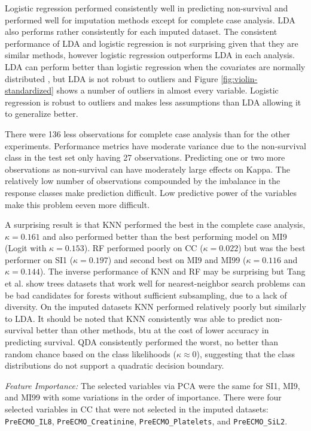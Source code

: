 \documentclass[12pt,]{article}
\begin{document}
Logistic regression performed consistently well in predicting
non-survival and performed well for imputation methods except for
complete case analysis. LDA also performs rather consistently for each
imputed dataset. The consistent performance of LDA and logistic
regression is not surprising given that they are similar methods,
however logistic regression outperforms LDA in each analysis. LDA can
perform better than logistic regression when the covariates are normally
distributed \autocite{efron_efficiency_1975}, but LDA is not robust to
outliers \autocite{hastie_elements_2009} and Figure
\ref{fig:violin-standardized} shows a number of outliers in almost every
variable. Logistic regression is robust to outliers and makes less
assumptions than LDA \autocite{hastie_elements_2009} allowing it to
generalize better.

There were 136 less observations for complete case analysis than for the
other experiments. Performance metrics have moderate variance due to the
non-survival class in the test set only having 27 observations.
Predicting one or two more observations as non-survival can have
moderately large effects on Kappa. The relatively low number of
observations compounded by the imbalance in the response classes make
prediction difficult. Low predictive power of the variables make this
problem eeven more difficult.

A surprising result is that KNN performed the best in the complete case
analysis, \(\kappa=0.161\) and also performed better than the best
performing model on MI9 (Logit with \(\kappa=0.153\)). RF performed
poorly on CC (\(\kappa=0.022\)) but was the best performer on SI1
(\(\kappa=0.197\)) and second best on MI9 and MI99 (\(\kappa=0.116\) and
\(\kappa=0.144\)). The inverse performance of KNN and RF may be
surprising but Tang et al. show \textcite{tang_when_2018} trees datasets
that work well for nearest-neighbor search problems can be bad
candidates for forests without sufficient subsampling, due to a lack of
diversity. On the imputed datasets KNN performed relatively poorly but
similarly to LDA. It should be noted that KNN consistently was able to
predict non-survival better than other methods, btu at the cost of lower
accuracy in predicting survival. QDA consistently performed the worst,
no better than random chance based on the class likelihoods
(\(\kappa \approx 0\)), suggesting that the class distributions do not
support a quadratic decision boundary.

\emph{Feature Importance:} The selected variables via PCA were the same
for SI1, MI9, and MI99 with some variations in the order of importance.
There were four selected variables in CC that were not selected in the
imputed datasets: \texttt{PreECMO\_IL8}, \texttt{PreECMO\_Creatinine},
\texttt{PreECMO\_Platelets}, and \texttt{PreECMO\_SiL2}.
\end{document}

